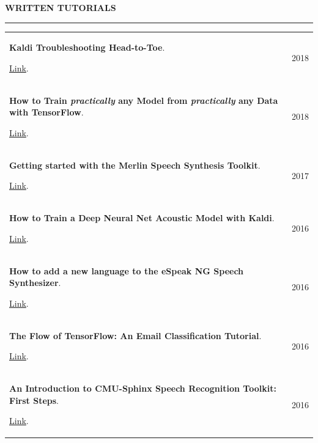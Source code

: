 \documentclass{resume} %
\begin{document}
\vspace{0.5cm}
\begin{minipage}{\textwidth}
\sectionskip
\MakeUppercase{\textbf{Written Tutorials}}
  \sectionlineskip
  \hrule
  \vspace{.5cm}
  
\renewcommand{\arraystretch}{1.5} %

\begin{tabular}{@{}p{}p{}@{}}
    {\bf Kaldi Troubleshooting Head-to-Toe}.
    
    \href{http://jrmeyer.github.io/asr/2019/08/17/Kaldi-troubleshooting.html}{Link}.
    &
    \hfill  {2018}
    \\
    {\bf How to Train \textit{practically} any Model from \textit{practically} any Data with TensorFlow}.
    
    \href{http://jrmeyer.github.io/machinelearning/2019/05/29/tensorflow-dataset-estimator-api.html}{Link}.
    &
    \hfill {2018}
    \\
    {\bf Getting started with the Merlin Speech Synthesis Toolkit}.
    
    \href{http://jrmeyer.github.io/tts/2017/02/14/Installing-Merlin.html}{Link}.
    &
    \hfill {2017}
    \\
    {\bf How to Train a Deep Neural Net Acoustic Model with Kaldi}.
    
    \href{http://jrmeyer.github.io/asr/2016/12/15/DNN-AM-Kaldi.html}{Link}.
    &
    \hfill {2016}
    \\
    {\bf How to add a new language to the eSpeak NG Speech Synthesizer}.
    
    \href{http://jrmeyer.github.io/tts/2016/07/03/How-to-Add-a-Language-to-eSpeak-NG.html}{Link}.
    &
    \hfill {2016}
    \\
    {\bf The Flow of TensorFlow: An Email Classification Tutorial}.
    
    \href{http://jrmeyer.github.io/machinelearning/2016/02/01/TensorFlow-Tutorial.html}{Link}.
    &
    \hfill {2016}
    \\
    {\bf An Introduction to CMU-Sphinx Speech Recognition Toolkit: First Steps}.
    
    \href{http://jrmeyer.github.io/asr/2016/01/09/Installing-CMU-Sphinx-on-Ubuntu.html}{Link}.
    &
    \hfill {2016}
    \\
\end{tabular}

\end{minipage}
\end{document}
